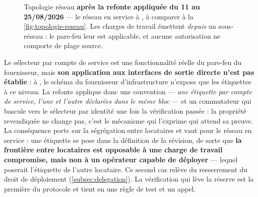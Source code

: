 \begin{figure}[htbp]
\caption[Topologie réseau après la refonte appliquée]{Topologie réseau \textbf{après la refonte
appliquée du 11 au 25/08/2026} --- le réseau en service à \dateref, à comparer à la
\cref{fig:topologie-reseau}. Les charges de travail émettent \emph{depuis} un sous-réseau : le
pare-feu leur est applicable, et aucune autorisation ne comporte de plage source.}
\label{fig:topologie-cible}
\end{figure}

\begin{alertbox}[title={Une limite du mécanisme, dite avant qu'un jury la trouve}]
Le sélecteur par compte de service est une fonctionnalité réelle du pare-feu du fournisseur, mais
\textbf{son application aux interfaces de sortie directe n'est pas établie} : à \dateref, le schéma
du fournisseur d'infrastructure n'expose que les étiquettes à ce niveau. La refonte applique donc
une convention --- \emph{une étiquette par compte de service, l'une et l'autre déclarées dans le
même bloc} --- et un commutateur qui bascule vers le sélecteur par identité une fois la
vérification passée : la propriété revendiquée ne change pas, c'est le mécanisme qui l'exprime qui
attend sa preuve. La conséquence porte sur la ségrégation entre locataires et vaut pour le réseau
en service : une étiquette se pose dans la définition de la révision, de sorte que \textbf{la
frontière entre locataires est opposable à une charge de travail compromise, mais non à un
opérateur capable de déployer} --- lequel poserait l'étiquette de l'autre locataire. Ce second cas
relève du resserrement du droit de déploiement (\cref{subsec:delegation}). La vérification qui lève
la réserve est la première du protocole et tient en une règle de test et un appel.
\end{alertbox}

